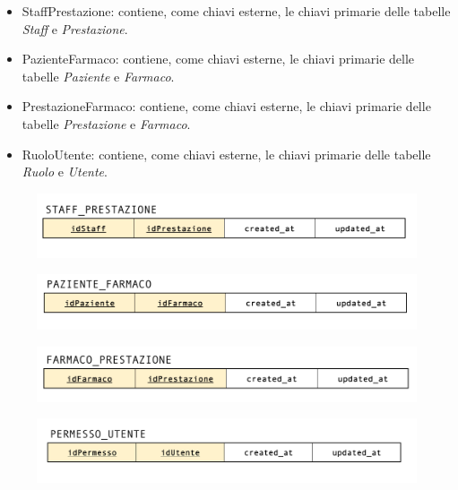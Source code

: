 \documentclass[paper=a4, fontsize=11pt,x11names]{report}
\begin{document}
\begin{itemize}
\item StaffPrestazione: contiene, come chiavi esterne, le chiavi primarie delle tabelle \textit{Staff} e \textit{Prestazione}.
\item PazienteFarmaco: contiene, come chiavi esterne, le chiavi primarie delle tabelle \textit{Paziente} e \textit{Farmaco}.
\item PrestazioneFarmaco: contiene, come chiavi esterne, le chiavi primarie delle tabelle \textit{Prestazione} e \textit{Farmaco}.
\item RuoloUtente: contiene, come chiavi esterne, le chiavi primarie delle tabelle \textit{Ruolo} e \textit{Utente}.
\end{itemize}

\begin{figure}[H]
\begin{center}
\includegraphics[scale=0.3]{staffPrestazioneSchema}
\end{center}
\end{figure}

\begin{figure}[H]
\begin{center}
\includegraphics[scale=0.3]{pazienteFarmacoSchema}
\end{center}
\end{figure}

\begin{figure}[H]
\begin{center}
\includegraphics[scale=0.3]{farmacoPrestazioneSchema}
\end{center}
\end{figure}

\begin{figure}[H]
\begin{center}
\includegraphics[scale=0.3]{permessiUtenteSchema}
\end{center}
\end{figure}
\end{document}
